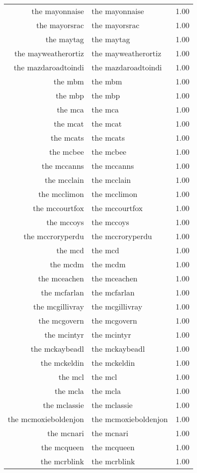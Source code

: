 \begin{table}[ht]
\begin{tabular}{rlr}
  the mayonnaise & the mayonnaise & 1.00 \\ 
  the mayorsrac & the mayorsrac & 1.00 \\ 
  the maytag & the maytag & 1.00 \\ 
  the mayweatherortiz & the mayweatherortiz & 1.00 \\ 
  the mazdaroadtoindi & the mazdaroadtoindi & 1.00 \\ 
  the mbm & the mbm & 1.00 \\ 
  the mbp & the mbp & 1.00 \\ 
  the mca & the mca & 1.00 \\ 
  the mcat & the mcat & 1.00 \\ 
  the mcats & the mcats & 1.00 \\ 
  the mcbee & the mcbee & 1.00 \\ 
  the mccanns & the mccanns & 1.00 \\ 
  the mcclain & the mcclain & 1.00 \\ 
  the mcclimon & the mcclimon & 1.00 \\ 
  the mccourtfox & the mccourtfox & 1.00 \\ 
  the mccoys & the mccoys & 1.00 \\ 
  the mccroryperdu & the mccroryperdu & 1.00 \\ 
  the mcd & the mcd & 1.00 \\ 
  the mcdm & the mcdm & 1.00 \\ 
  the mceachen & the mceachen & 1.00 \\ 
  the mcfarlan & the mcfarlan & 1.00 \\ 
  the mcgillivray & the mcgillivray & 1.00 \\ 
  the mcgovern & the mcgovern & 1.00 \\ 
  the mcintyr & the mcintyr & 1.00 \\ 
  the mckaybeadl & the mckaybeadl & 1.00 \\ 
  the mckeldin & the mckeldin & 1.00 \\ 
  the mcl & the mcl & 1.00 \\ 
  the mcla & the mcla & 1.00 \\ 
  the mclassie & the mclassie & 1.00 \\ 
  the mcmoxieboldenjon & the mcmoxieboldenjon & 1.00 \\ 
  the mcnari & the mcnari & 1.00 \\ 
  the mcqueen & the mcqueen & 1.00 \\ 
  the mcrblink & the mcrblink & 1.00 \\ 

\end{tabular}
\end{table}
